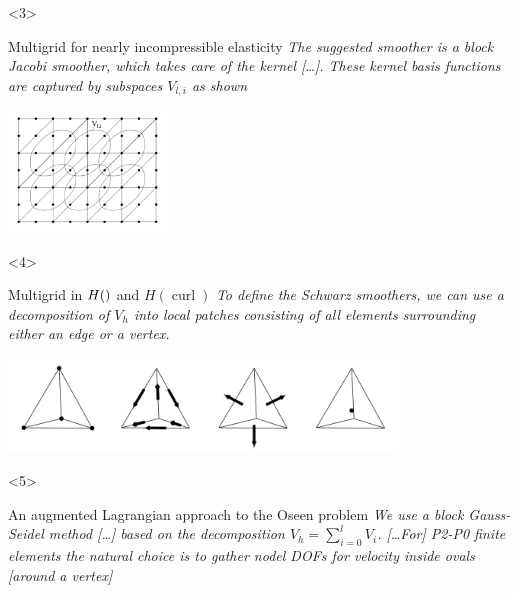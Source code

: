 \documentclass[presentation,aspectratio=43, 10pt]{beamer}
\let\div\relax
\DeclareMathOperator{\div}{div}
\DeclareMathOperator{\curl}{curl}
\begin{document}
\begin{frame}[t]
  \begin{onlyenv}<3>
    \begin{block}{Multigrid for nearly incompressible elasticity}
      \emph{The suggested smoother is a block Jacobi smoother, which takes
      care of the kernel [\dots]. These kernel basis functions are
      captured by subspaces $V_{l,i}$ as shown}
      \begin{center}
        \includegraphics[height=3.25cm]{schoeberl}
      \end{center}
      {\hfill\textcite{Schoeberl:1999}}
    \end{block}
  \end{onlyenv}

  \begin{onlyenv}<4>
    \begin{block}{Multigrid in $H(\div)$ and $H(\curl)$}
      \emph{To define the Schwarz smoothers, we can use a decomposition of
      $V_h$ into local patches consisting of all elements surrounding
      either an edge or a vertex.}

      \begin{center}
        \includegraphics[height=2.5cm]{arnold}
      \end{center}
      {\hfill\textcite{Arnold:2000}}
    \end{block}
  \end{onlyenv}

  \begin{onlyenv}<5>
    \begin{block}{An augmented Lagrangian approach to the Oseen problem}
      \emph{We use a block Gauss-Seidel method [\dots] based on the
      decomposition $V_h = \sum_{i=0}^l V_i$. [\dots For] P2-P0 finite
      elements the natural choice is to gather nodel DOFs for velocity
      inside ovals [around a vertex]}


\end{block}
\end{onlyenv}
\end{frame}
\end{document}
